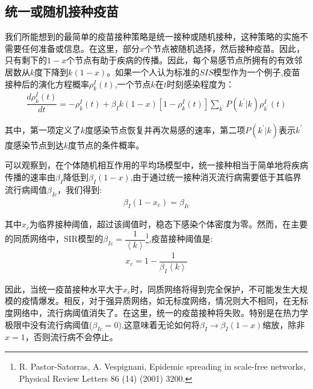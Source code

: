 \documentclass[UTF8]{ctexart}
\begin{document}
	\subsection{统一或随机接种疫苗}
	我们所能想到的最简单的疫苗接种策略是统一接种或随机接种，这种策略的实施不需要任何准备或信息。在这里，部分$x$个节点被随机选择，然后接种疫苗。因此，只有剩下的$1-x$个节点有助于疾病的传播。因此，每个易感节点所拥有的有效邻居数从$k$度下降到$k(1−x)$。如果一个人认为标准的$SIS$模型作为一个例子,疫苗接种后的演化方程概率$\rho_{k}^{I}(t)$,一个节点$k$在$t$时刻感染程度为：
	\begin{equation}
		\begin{aligned}
			\dfrac{d\rho_{k}^{I}(t)}{dt}=-\rho_{k}^{I}(t)+\beta_{I}k(1-x)[1-\rho_{k}^{I}(t)]\sum\limits_{k^{\prime}}P(k^{\prime}|k)\rho_{k^{\prime}}^{I}(t)
		\end{aligned}
	\end{equation}
\par 其中，第一项定义了$k$度感染节点恢复并再次易感的速率，第二项$P(k^{\prime}|k)$表示$k^{\prime}$度感染节点到达$k$度节点的条件概率。
\par 可以观察到，在个体随机相互作用的平均场模型中，统一接种相当于简单地将疾病传播的速率由$\beta_{I}$降低到$\beta_{I}(1-x)$,由于通过统一接种消灭流行病需要低于其临界流行病阈值$\beta_{Ic}$，我们得到:
\begin{equation}
	\begin{aligned}
		\beta_{I}(1-x_{c})=\beta_{Ic}
	\end{aligned}
\end{equation}
\par 其中$x_{c}$为临界接种阈值，超过该阈值时，稳态下感染个体密度为零。然而，在主要的同质网络中，SIR模型的$\beta_{Ic}=\dfrac{1}{\left\langle k\right\rangle}$\footnote{R. Pastor-Satorras, A. Vespignani, Epidemic spreading in scale-free networks, Physical Review Letters 86 (14) (2001)
	3200.},疫苗接种阈值是:
\begin{equation}
	\begin{aligned}
		x_{c}=1-\dfrac{1}{\beta_{I}\left\langle k\right\rangle}
	\end{aligned}
\end{equation}
\par 因此，当统一疫苗接种水平大于$x_{c}$时，同质网络将得到完全保护，不可能发生大规模的疫情爆发。相反，对于强异质网络，如无标度网络，情况则大不相同，在无标度网络中，流行病阈值消失了。在这里，统一的疫苗接种将失败。特别是在热力学极限中没有流行病阈值($\beta_{Ic}= 0$),这意味着无论如何将$\beta_{I}\to \beta_{I}(1-x)$缩放，除非$x=1$，否则流行病不会停止。
\end{document}
